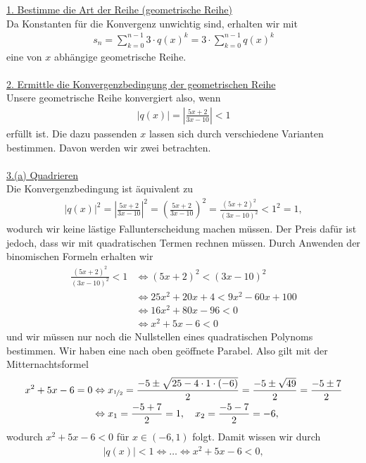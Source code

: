 \underline{1. Bestimme die Art der Reihe (geometrische Reihe)}\\
Da Konstanten für die Konvergenz unwichtig sind, erhalten wir mit
\begin{align*}
s_n = \sum_{k=0}^{n-1} 3 \cdot q(x)^k = 3 \cdot\sum_{k=0}^{n-1}  q(x)^k
\end{align*}
eine von $x$ abhängige geometrische Reihe.
\\
\\
\underline{2. Ermittle die Konvergenzbedingung der geometrischen Reihe}\\
Unsere geometrische Reihe konvergiert also, wenn
\begin{align}
|q(x)| =\left| \frac{5x+2}{3x-10} \right|   < 1  
\end{align}
erfüllt ist. Die dazu passenden $x$ lassen sich durch verschiedene Varianten bestimmen. Davon werden wir zwei betrachten.\\
\\
\underline{3.(a) Quadrieren}\\
Die Konvergenzbedingung ist äquivalent zu
\begin{align*}
|q(x)|^2 
= \left| \frac{5x+2}{3x-10} \right|^2
= \left( \frac{5x+2}{3x-10} \right)^2
=\frac{(5x+2)^2}{(3x-10)^2} 
< 1^2 =1,
\end{align*}
wodurch wir keine lästige Fallunterscheidung machen müssen.
Der Preis dafür ist jedoch, dass wir mit quadratischen Termen rechnen müssen.
Durch Anwenden der binomischen Formeln erhalten wir
\begin{align*}
\frac{(5x+2)^2}{(3x-10)^2} <1
&\Leftrightarrow
(5x+2)^2 < (3x-10)^2\\
&\Leftrightarrow
25x^2 + 20x +4 < 9x^2 -60x +100\\
&\Leftrightarrow
16x^2 + 80x -96 < 0\\
&\Leftrightarrow
x^2 +5x -6 <0
\end{align*}
und wir müssen nur noch die Nullstellen eines quadratischen Polynoms bestimmen. Wir haben eine nach oben geöffnete Parabel. Also gilt mit der Mitternachtsformel 
\begin{align*}
x^2 +5x -6 = 0 
&\Leftrightarrow
x_{\nicefrac{1}{2}}=\frac{-5 \pm \sqrt{25 -4\cdot 1\cdot(-6)}}{2}
= \frac{-5 \pm \sqrt{49}}{2}
= \frac{-5 \pm 7}{2}
\\
&\Leftrightarrow
x_1 = \frac{-5 + 7}{2} = 1, \quad x_2 = \frac{-5-7}{2} = -6,
\end{align*}
wodurch $x^2+5x-6 < 0$ für $x \in (-6,1)$ folgt.
Damit wissen wir durch
\begin{align*}
|q(x) | < 1 
\Leftrightarrow
\dots
\Leftrightarrow
x^2+5x-6 < 0,
\end{align*}
